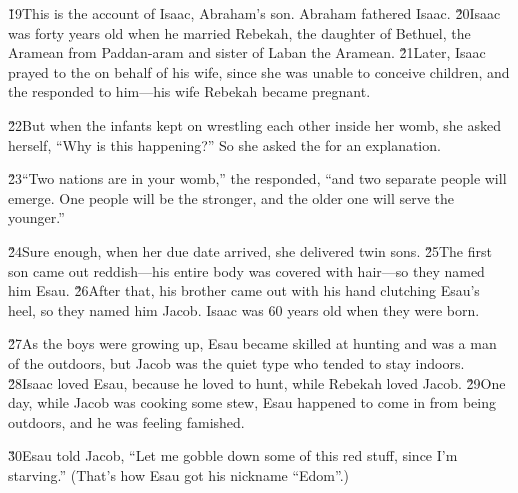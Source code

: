\v{19}This is the account of Isaac, Abraham's son. Abraham fathered Isaac. \v{20}Isaac was forty years old when he married Rebekah, the daughter of Bethuel, the Aramean from Paddan-aram and sister of Laban the Aramean. \v{21}Later, Isaac prayed to the  on behalf of his wife, since she was unable to conceive children, and the  responded to him---his wife Rebekah became pregnant.

\v{22}But when the infants kept on wrestling each other inside her womb, she asked herself, ``Why is this happening?'' So she asked the  for an explanation.

\v{23}``Two nations are in your womb,'' the  responded, ``and two separate people will emerge. One people will be the stronger, and the older one will serve the younger.''

\v{24}Sure enough, when her due date arrived, she delivered twin sons. \v{25}The first son came out reddish---his entire body was covered with hair---so they named him Esau. \v{26}After that, his brother came out with his hand clutching Esau's heel, so they named him Jacob. Isaac was 60 years old when they were born.

\v{27}As the boys were growing up, Esau became skilled at hunting and was a man of the outdoors, but Jacob was the quiet type who tended to stay indoors. \v{28}Isaac loved Esau, because he loved to hunt, while Rebekah loved Jacob. \v{29}One day, while Jacob was cooking some stew, Esau happened to come in from being outdoors, and he was feeling famished.

\v{30}Esau told Jacob, ``Let me gobble down some of this red stuff, since I'm starving.'' (That's how Esau got his nickname ``Edom''.)

